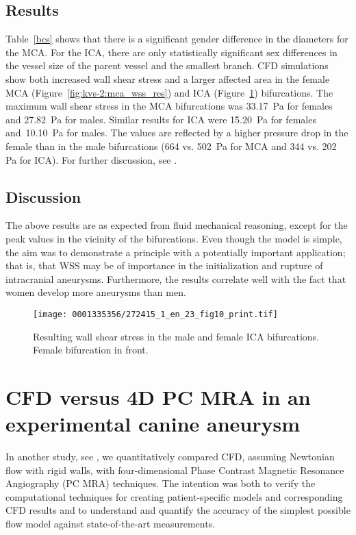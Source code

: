 \subsection{Results}

Table~\ref{bcs} shows that there is a significant gender difference in
the diameters for the MCA. For the ICA, there are only statistically
significant sex differences in the vessel size of the parent vessel
and the smallest branch. CFD simulations show both increased wall
shear stress and a larger affected area in the female MCA
(Figure~\ref{fig:kvs-2:mca_wss_res}) and ICA
(Figure~\ref{fig:kvs-2:ica_wss_res}) bifurcations. The maximum wall
shear stress in the MCA bifurcations was 33.17~Pa for females and
27.82~Pa for males. Similar results for ICA were 15.20~Pa for females
and~10.10~Pa for males. The values are reflected by a higher pressure
drop in the female than in the male bifurcations (664 vs. 502~Pa for MCA
and 344 vs. 202 Pa for ICA). For further discussion,
see \citet{LindekleivValen-SendstadMorganEtAl2010}.

\subsection{Discussion}

The above results are as expected from fluid mechanical reasoning,
except for the peak values in the vicinity of the bifurcations. Even
though the model is simple, the aim was to demonstrate a principle
with a potentially important application; that is, that WSS may be of
importance in the initialization and rupture of intracranial
aneurysms. Furthermore, the results correlate well with the fact that
women develop more aneurysms than men.

\begin{figure}
\centering
\texttt{[image: 0001335356/272415\_1\_en\_23\_fig10\_print.tif]}
\caption{Resulting wall shear stress in the male and female ICA
bifurcations. Female bifurcation in front.}
\label{fig:kvs-2:ica_wss_res}\vspace*{6pt}
\end{figure}

\vspace*{5pt}
\section{CFD versus 4D PC MRA in an experimental canine aneurysm} \label{dog_study}

In another study, see \citet{JiangJohnsonValen-SendstadEtAl2010}, we
quantitatively compared CFD, assuming Newtonian flow with rigid walls,
with four-dimensional Phase Contrast Magnetic Resonance Angiography
(PC MRA) techniques. The intention was both to verify the
computational techniques for creating patient-specific models and
corresponding CFD results and to understand and quantify the accuracy
of the simplest possible flow model against state-of-the-art
measurements.


